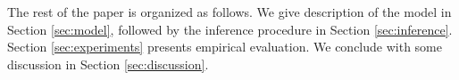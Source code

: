 The rest of the paper is organized as follows.
We give description of the model in Section \ref{sec:model}, followed by the inference procedure in Section \ref{sec:inference}. 
Section \ref{sec:experiments} presents empirical evaluation.
We conclude with some discussion in Section \ref{sec:discussion}.









 
